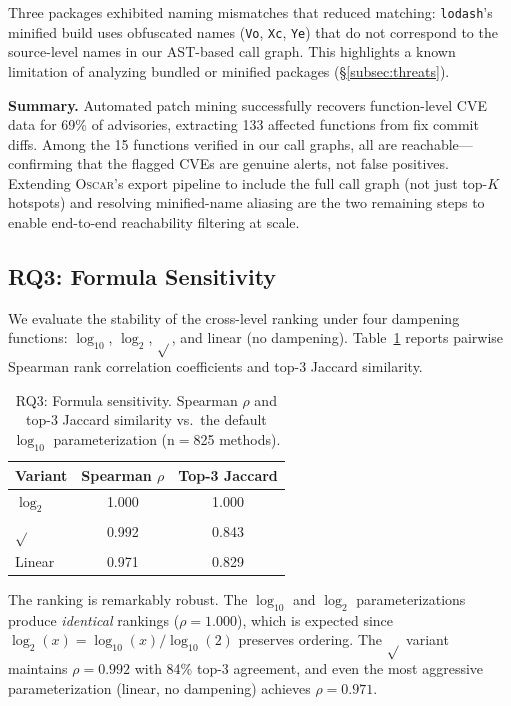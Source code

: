 \documentclass[conference]{IEEEtran}
\begin{document}
Three packages exhibited naming mismatches that reduced matching: \texttt{lodash}'s minified build uses obfuscated names (\texttt{Vo}, \texttt{Xc}, \texttt{Ye}) that do not correspond to the source-level names in our AST-based call graph. This highlights a known limitation of analyzing bundled or minified packages (§\ref{subsec:threats}).

\textbf{Summary.} Automated patch mining successfully recovers function-level CVE data for 69\% of advisories, extracting 133 affected functions from fix commit diffs. Among the 15 functions verified in our call graphs, all are reachable---confirming that the flagged CVEs are genuine alerts, not false positives. Extending \textsc{Oscar}'s export pipeline to include the full call graph (not just top-$K$ hotspots) and resolving minified-name aliasing are the two remaining steps to enable end-to-end reachability filtering at scale.

\subsection{RQ3: Formula Sensitivity}
\label{subsec:rq3}

We evaluate the stability of the cross-level ranking under four dampening functions: $\log_{10}$, $\log_2$, $\sqrt{}$, and linear (no dampening). Table~\ref{tab:rq3} reports pairwise Spearman rank correlation coefficients and top-3 Jaccard similarity.

\begin{table}[t]
    \centering
    \caption{RQ3: Formula sensitivity. Spearman $\rho$ and top-3 Jaccard similarity vs.\ the default $\log_{10}$ parameterization (n$=$825 methods).}
    \label{tab:rq3}
    \begin{tabular}{l cc}
        \toprule
        \textbf{Variant} & \textbf{Spearman $\rho$} & \textbf{Top-3 Jaccard} \\
        \midrule
        $\log_2$  & 1.000 & 1.000 \\
        $\sqrt{}$ & 0.992 & 0.843 \\
        Linear    & 0.971 & 0.829 \\
        \bottomrule
    \end{tabular}
\end{table}

The ranking is remarkably robust. The $\log_{10}$ and $\log_2$ parameterizations produce \emph{identical} rankings ($\rho = 1.000$), which is expected since $\log_2(x) = \log_{10}(x) / \log_{10}(2)$ preserves ordering. The $\sqrt{}$ variant maintains $\rho = 0.992$ with 84\% top-3 agreement, and even the most aggressive parameterization (linear, no dampening) achieves $\rho = 0.971$.
\end{document}
